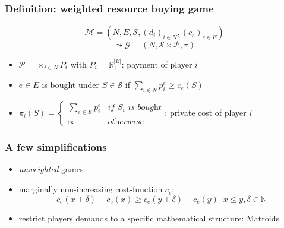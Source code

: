 \documentclass{beamer}
\newcommand{\tupel}[1]{\left(#1\right)}
\begin{document}
\begin{frame}
  \frametitle{Definition: weighted resource buying game}
  \begin{equation*}
    \mathcal{M} = \tupel{N, E, \mathcal{S}, \left(d_{i}\right)_{i\in N},
    \left(c_{e}\right)_{e\in E}}
  \end{equation*}
  \begin{equation*}
    \leadsto\mathcal{G} = \tupel{N, \mathcal{S}\times\mathcal{P}, \pi}
  \end{equation*}
  \vspace{-1cm}
  \begin{itemize}
    \item $\mathcal{P}=\times_{i\in N} P_{i}$ with
      $P_{i} = \mathbb{R}^{|E|}_{+}$: payment of player $i$
    \item $e\in E$ is bought under $S\in \mathcal{S}$ if
      $\sum_{i\in N}p_{i}^{e} \geq c_{e}(S)$
    \item $\pi_{i}(S) =
      \begin{cases}
        \sum_{e\in E}p_{i}^{e} &\textit{if }S_{i}\textit{ is bought}\\
        \infty &\textit{otherwise}
      \end{cases}$: {private cost of player $i$}
  \end{itemize}
\end{frame}

\begin{frame}
  \frametitle{A few simplifications}
  \begin{itemize}
    \item \emph{unweighted} games
    \item marginally non-increasing cost-function $c_{e}$:
      \begin{equation*}
        c_{e}(x + \delta) - c_{e}(x) \geq c_{e}(y + \delta) - c_{e}(y)
        \;\;x\leq y, \delta \in \mathbb{N}
      \end{equation*}
      \begin{center}
      \end{center}
    \item restrict players demands to a specific mathematical structure:
      Matroids
  \end{itemize}
\end{frame}
\end{document}
